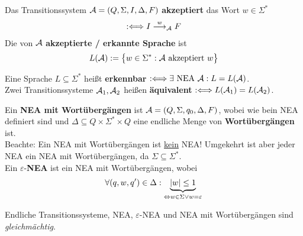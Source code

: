 \begin{definition}\label{def1.5}
	Das Transitionssystem $\mathcal{A}=(Q,\Sigma,I,\Delta,F)$ \textbf{akzeptiert} das Wort $w\in\Sigma^\ast$
	\begin{align*}
		:\Longleftrightarrow I\overset{w}{\longrightarrow}_{\mathcal{A}} F
	\end{align*}
	Die von $\mathcal{A}$ \textbf{akzeptierte / erkannte Sprache} ist
	\begin{align*}
		L(\mathcal{A}):=\big\lbrace w\in\Sigma^\ast:\mathcal{A}\text{ akzeptiert }w\big\rbrace
	\end{align*}
\end{definition}

\begin{definition}\label{def1.6}
	Eine Sprache $L\subseteq\Sigma^\ast$ heißt \textbf{erkennbar} $:\Longleftrightarrow\exists\text{ NEA }\mathcal{A}:L=L(\mathcal{A})$.\\
	Zwei Transitionssysteme $\mathcal{A}_1,\mathcal{A}_2$ heißen \textbf{äquivalent} $:\Longleftrightarrow L(\mathcal{A}_1)=L(\mathcal{A}_2)$.
\end{definition}

\begin{definition}\label{def1.8}
	Ein \textbf{NEA mit Wortübergängen} ist $\mathcal{A}=(Q,\Sigma,q_0,\Delta,F)$, wobei wie bein NEA definiert sind und $\Delta\subseteq Q\times\Sigma^\ast\times Q$ eine endliche Menge von \textbf{Wortübergängen} ist.\\
	Beachte: Ein NEA mit Wortübergängen ist \underline{kein} NEA!
	Umgekehrt ist aber jeder NEA ein NEA mit Wortübergängen, da $\Sigma\subseteq\Sigma^\ast$.\\
	Ein $\varepsilon$-\textbf{NEA} ist ein NEA mit Wortübergängen, wobei
	\begin{align*}
		\forall(q,w,q')\in\Delta:\underbrace{|w|\leq 1}_{\Leftrightarrow w\in\Sigma\vee w=\varepsilon}
	\end{align*}
\end{definition}

\begin{satz}\label{satz1.9}
	Endliche Transitionssysteme, NEA, $\varepsilon$-NEA und NEA mit Wortübergängen sind \textit{gleichmächtig}. 
\end{satz}


